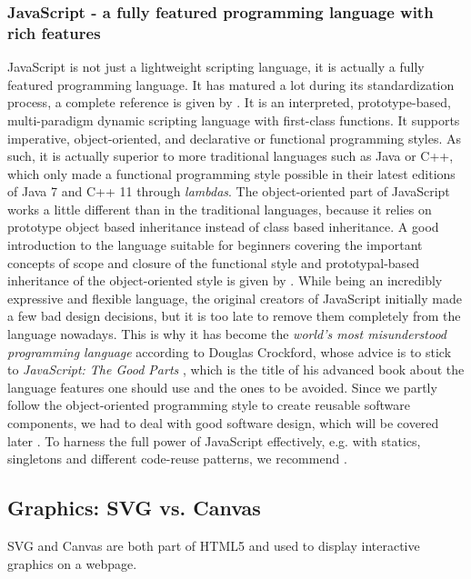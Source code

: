 \subsubsection{JavaScript - a fully featured programming language with rich features}
JavaScript is not just a lightweight scripting language, it is actually a fully featured programming language. It has matured a lot during its standardization process, a complete reference is given by \cite{flanagan2011javascript}. It is an interpreted, prototype-based, multi-paradigm dynamic scripting language with first-class functions. It supports imperative, object-oriented, and declarative or functional programming styles. As such, it is actually superior to more traditional languages such as Java or C++, which only made a functional programming style possible in their latest editions of Java 7 and C++ 11 through \textit{lambdas}. The object-oriented part of JavaScript works a little different than in the traditional languages, because it relies on prototype object based inheritance instead of class based inheritance. A good introduction to the language suitable for beginners covering the important concepts of scope and closure of the functional style and prototypal-based inheritance of the object-oriented style is given by \cite{haverbeke2015eloquent,resig2013secrets}.
While being an incredibly expressive and flexible language, the original creators of JavaScript initially made a few bad design decisions, but it is too late to remove them completely from the language nowadays. This is why it has become the \textit{world's most misunderstood programming language} according to Douglas Crockford, whose advice is to stick to \textit{JavaScript: The Good Parts} \cite{crockford2008javascript}, which is the title of his advanced book about the language features one should use and the ones to be avoided.
Since we partly follow the object-oriented programming style to create reusable software components, we had to deal with good software design, which will be covered later . To harness the full power of JavaScript effectively, e.g. with statics, singletons and different code-reuse patterns, we recommend \cite{herman2012effective}.

\subsection{Graphics: SVG vs. Canvas}\label{sec:graphics}
SVG and Canvas are both part of HTML5 and used to display interactive graphics on a webpage. 

